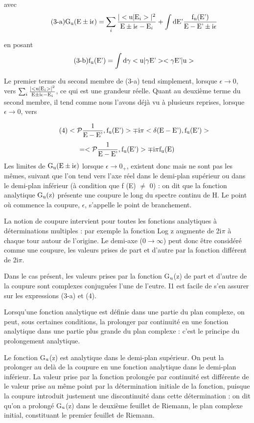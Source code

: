 avec
\[
\tag{3-a} \text{G}_{\text{u}} (\text{E} \pm \text{i}\epsilon) =
\sum_i\frac{|<\text{u}|\text{E}_i>|^2}{\text{E} \pm \text{i}\epsilon-\text{E}_i} +
\int\text{dE'}\frac{\text{f}_{\text{u}}(\text{E'})}{\text{E}-\text{E'}\pm\text{i}\epsilon}
\]

en posant
\[
\tag{3-b} \text{f}_{\text{u}}(\text{E'})=\int\text{d}\gamma<\text{u}|\gamma \text{E'}><\gamma \text{E'}|\text{u}>
\]

Le premier terme du second membre de (3-a) tend simplement,
lorsque $\epsilon \to 0$, vers $\sum_i\frac{|<\text{u}|\text{E}_i>|^2}{\text{E} \pm \text{i}\epsilon-\text{E}_i}$, ce qui est une grandeur réelle.
Quant au deuxième terme du second membre, il tend comme nous l'avons déjà
vu à plusieurs reprises, lorsque $\epsilon \to 0$, vers

\[
\tag{4} <\mathcal{P}\frac{1}{\text{E}-\text{E'}},\text{f}_{\text{u}}(\text{E'})> \mp
\text{i}\pi<\delta(\text{E}-\text{E'}),\text{f}_{\text{u}}(\text{E'})>
\]
\[
=<\mathcal{P}\frac{1}{\text{E}-\text{E'}},\text{f}_{\text{u}}(\text{E'})> \mp
\text{i}\pi\text{f}_{\text{u}}(\text{E})
\]
Les limites de $\text{G}_{\text{u}} (\text{E} \pm \text{i}\epsilon)$ lorsque $\epsilon \to 0_+$, existent donc mais ne
sont pas les mêmes, suivant que l'on tend vers l'axe réel dans le demi-plan
supérieur ou dans le demi-plan inférieur (à condition que f (E) $\ne$ 0) : on
dit que la fonction analytique $\text{G}_{\text{u}} (\text{z})$ présente une coupure le long du spectre
continu de H. Le point où commence la coupure, $\epsilon$, s'appelle le point de branchement.

La notion de coupure intervient pour toutes les fonctions analytiques à déterminations multiples : par exemple la fonction Log z augmente de
2i$\pi$ à chaque tour autour de l'origine. Le demi-axe ($0\to\infty$) peut donc être
considéré comme une coupure, les valeurs prises de part et d'autre par la
fonction différent de 2i$\pi$.


Dans le cas présent, les valeurs prises par la fonction G$_{\text{u}}$(z)
de part et d'autre de la coupure sont complexes conjuguées l'une de l'eutre.
I1 est facile de s'en assurer sur les expressions (3-a) et (4).

Lorsqu'une fonction analytique est définie dans une partie du
plan complexe, on peut, sous certaines conditions, la prolonger par continuité en une fonction analytique dans une partie plus grande du plan complexe :
c'est le principe du prolongement analytique.

Le fonction G$_{\text{u}}$(z) est analytique dans le demi-plan supérieur.
On peut la prolonger au delà de la coupure en une fonction analytique dans
le demi-plan inférieur. La valeur prise par la fonction prolongée par continuité est différente de le valeur prise au même point par la détermination
initiale de la fonction, puisque la coupure introduit justement une discontinuité dans cette détermination : on dit qu'on a prolongé G$_{\text{u}}$(z) dans le
deuxième feuillet de Riemann, le plan complexe initial, constituant le premier
feuillet de Riemann.

